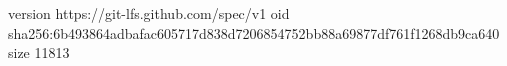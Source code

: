 version https://git-lfs.github.com/spec/v1
oid sha256:6b493864adbafac605717d838d7206854752bb88a69877df761f1268db9ca640
size 11813
